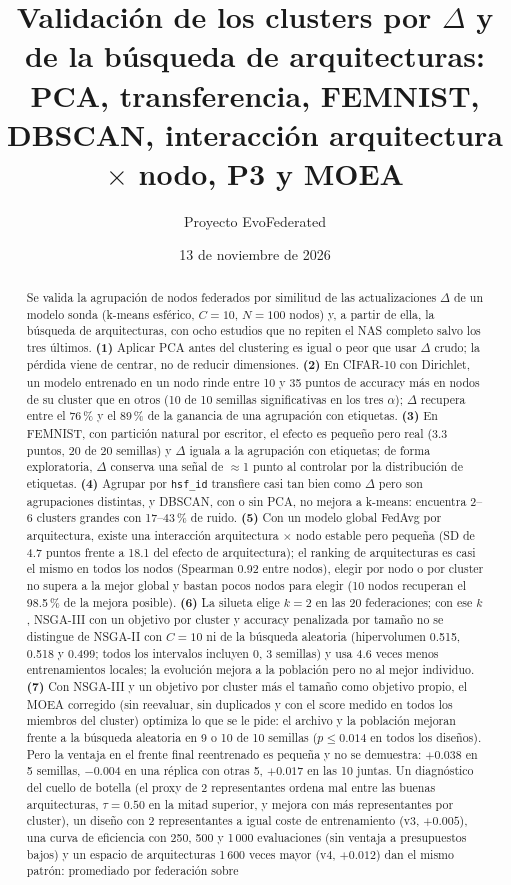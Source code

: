 \documentclass[11pt,a4paper]{article}
\title{Validación de los clusters por $\Delta$ y de la búsqueda de arquitecturas:\\ PCA, transferencia, FEMNIST, DBSCAN, interacción arquitectura $\times$ nodo, P3 y MOEA}
\author{Proyecto EvoFederated}
\date{13 de noviembre de 2026}
\begin{document}
\maketitle

\begin{abstract}
\noindent Se valida la agrupación de nodos federados por similitud de las actualizaciones $\Delta$ de un modelo sonda (k-means esférico, $C=10$, $N=100$ nodos) y, a partir de ella, la búsqueda de arquitecturas, con ocho estudios que no repiten el NAS completo salvo los tres últimos. \textbf{(1)} Aplicar PCA antes del clustering es igual o peor que usar $\Delta$ crudo; la pérdida viene de centrar, no de reducir dimensiones. \textbf{(2)} En CIFAR-10 con Dirichlet, un modelo entrenado en un nodo rinde entre 10 y 35 puntos de accuracy más en nodos de su cluster que en otros (10 de 10 semillas significativas en los tres $\alpha$); $\Delta$ recupera entre el 76\,\% y el 89\,\% de la ganancia de una agrupación con etiquetas. \textbf{(3)} En FEMNIST, con partición natural por escritor, el efecto es pequeño pero real (3.3 puntos, 20 de 20 semillas) y $\Delta$ iguala a la agrupación con etiquetas; de forma exploratoria, $\Delta$ conserva una señal de $\approx$1 punto al controlar por la distribución de etiquetas. \textbf{(4)} Agrupar por \texttt{hsf\_id} transfiere casi tan bien como $\Delta$ pero son agrupaciones distintas, y DBSCAN, con o sin PCA, no mejora a k-means: encuentra 2--6 clusters grandes con 17--43\,\% de ruido. \textbf{(5)} Con un modelo global FedAvg por arquitectura, existe una interacción arquitectura $\times$ nodo estable pero pequeña (SD de 4.7 puntos frente a 18.1 del efecto de arquitectura); el ranking de arquitecturas es casi el mismo en todos los nodos (Spearman 0.92 entre nodos), elegir por nodo o por cluster no supera a la mejor global y bastan pocos nodos para elegir (10 nodos recuperan el 98.5\,\% de la mejora posible). \textbf{(6)} La silueta elige $k=2$ en las 20 federaciones; con ese $k$, NSGA-III con un objetivo por cluster y accuracy penalizada por tamaño no se distingue de NSGA-II con $C=10$ ni de la búsqueda aleatoria (hipervolumen 0.515, 0.518 y 0.499; todos los intervalos incluyen 0, 3 semillas) y usa 4.6 veces menos entrenamientos locales; la evolución mejora a la población pero no al mejor individuo. \textbf{(7)} Con NSGA-III y un objetivo por cluster más el tamaño como objetivo propio, el MOEA corregido (sin reevaluar, sin duplicados y con el score medido en todos los miembros del cluster) optimiza lo que se le pide: el archivo y la población mejoran frente a la búsqueda aleatoria en 9 o 10 de 10 semillas ($p\le0.014$ en todos los diseños). Pero la ventaja en el frente final reentrenado es pequeña y no se demuestra: $+0.038$ en 5 semillas, $-0.004$ en una réplica con otras 5, $+0.017$ en las 10 juntas. Un diagnóstico del cuello de botella (el proxy de 2 representantes ordena mal entre las buenas arquitecturas, $\tau=0.50$ en la mitad superior, y mejora con más representantes por cluster), un diseño con 2 representantes a igual coste de entrenamiento (v3, $+0.005$), una curva de eficiencia con 250, 500 y 1\,000 evaluaciones (sin ventaja a presupuestos bajos) y un espacio de arquitecturas 1\,600 veces mayor (v4, $+0.012$) dan el mismo patrón: promediado por federación sobre 
\end{abstract}
\end{document}
